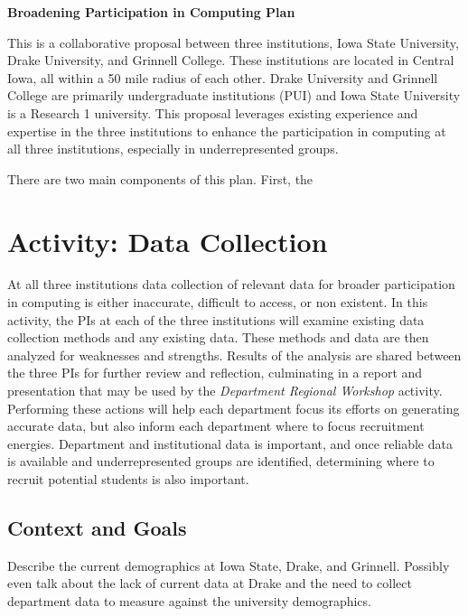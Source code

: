 \documentclass[11pt]{article}
\begin{document}
    \setcounter{page}{1}
    \begin{center}
        {\Large {\bf Broadening Participation in Computing Plan}}
    \end{center}

	This is a collaborative proposal between three institutions, Iowa State University, Drake University, and Grinnell College.  These institutions are located in Central Iowa, all within a 50 mile radius of each other.  Drake University and Grinnell College are primarily undergraduate institutions (PUI) and Iowa State University is a Research 1 university.  This proposal leverages existing experience and expertise in the three institutions to enhance the participation in computing at all three institutions, especially in underrepresented groups.

    There are two main components of this plan.  First, the 
    

    \section{Activity: Data Collection}
    At all three institutions data collection of relevant data for broader participation in computing is either inaccurate, difficult to access, or non existent.
    In this activity, the PIs at each of the three institutions will examine existing data collection methods and any existing data.
    These methods and data are then analyzed for weaknesses and strengths.  Results of the analysis are shared between the three PIs for further review and reflection, culminating in a report and presentation that may be used by the {\it Department Regional Workshop} activity.
    Performing these actions will help each department focus its efforts on generating accurate data, but also inform each department where to focus recruitment energies.
    Department and institutional data is important, and once reliable data is available and underrepresented groups are identified, determining where to recruit potential students is also important.
    
    
    
    

    \subsection{Context and Goals}
    Describe the current demographics at Iowa State, Drake, and Grinnell.
    Possibly even talk about the lack of current data at Drake and the need to collect department data to measure against the university demographics.
\end{document}
